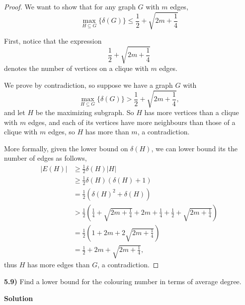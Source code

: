 \documentclass[11pt]{article}
\theoremstyle{plain}
\begin{document}
\begin{proof}


We want to show that for any graph $G$ with $m$ edges,
\begin{equation}
\max_{H\subseteq G}\{\delta(G)\} \leq \frac{1}{2} + \sqrt{2m+\frac{1}{4}}
\end{equation}

First, notice that the expression
\begin{equation}
\frac{1}{2} + \sqrt{2m+\frac{1}{4}}
\end{equation}
denotes the number of vertices on a clique with $m$ edges.

We prove by contradiction, so suppose we have a graph $G$ with
\begin{equation}
\max_{H\subseteq G}\{\delta(G)\} > \frac{1}{2} + \sqrt{2m+\frac{1}{4}},
\end{equation}
and let $H$ be the maximizing subgraph. So $H$ has more vertices than a clique with $m$ edges, and each of its vertices have more neighbours than those of a clique with $m$ edges, so $H$ has more than $m$, a contradiction.

More formally, given the lower bound on $\delta(H)$, we can lower bound its the number of edges as follows,
\begin{align*}
|E(H)| & \geq \frac{1}{2} \delta(H) |H| \\
& \geq \frac{1}{2} \delta(H) (\delta(H) + 1) \\
& = \frac{1}{2} (\delta(H)^2 + \delta(H)) \\
& > \frac{1}{2} \left(\frac{1}{4} + \sqrt{2m+\frac{1}{4}} + 2m+\frac{1}{4} + \frac{1}{2} + \sqrt{2m+\frac{1}{4}}\right) \\
& = \frac{1}{2} \left(1+2m+2\sqrt{2m+\frac{1}{4}}\right) \\
& = \frac{1}{2} + 2m +\sqrt{2m+\frac{1}{4}},
\end{align*}
thus $H$ has more edges than $G$, a contradiction.
\end{proof}


\noindent \textbf{5.9)} Find a lower bound for the colouring number in terms of average degree.

\vspace{.4cm}
\noindent \textbf{Solution} 
\end{document}
